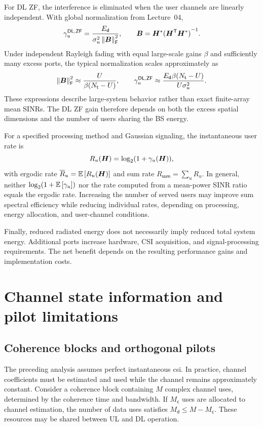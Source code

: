 For DL ZF, the interference is eliminated when the user channels are linearly independent. With global normalization from Lecture~04,
\begin{equation*}
	\gamma_u^{\mathsf{DL},\mathsf{ZF}}
	=\frac{E_{\mathsf{d}}}{\sigma_u^2\left\|\bm{B}\right\|_{\mathsf{F}}^2},
	\qquad
	\bm{B}=\bm{H}^*{({\bm{H}}^{\mathsf{T}}\bm{H}^*)}^{-1}.
\end{equation*}
Under independent Rayleigh fading with equal large-scale gains $\beta$ and sufficiently many excess ports, the typical normalization scales approximately as
\begin{equation*}
	\left\|\bm{B}\right\|_{\mathsf{F}}^2
	\approx\frac{U}{\beta(N_{\mathsf{t}}-U)},
	\qquad
	\gamma_u^{\mathsf{DL},\mathsf{ZF}}
	\approx\frac{E_{\mathsf{d}}\beta(N_{\mathsf{t}}-U)}{U\sigma_u^2}.
\end{equation*}
These expressions describe large-system behavior rather than exact finite-array mean SINRs. The DL ZF gain therefore depends on both the excess spatial dimensions and the number of users sharing the BS energy.

For a specified processing method and Gaussian signaling, the instantaneous user rate is
\begin{equation*}
	R_u(\bm{H})=\log_2(1+\gamma_u(\bm{H})),
\end{equation*}
with ergodic rate $\overline R_u=\mathbb{E}\left[R_u(\bm{H})\right]$ and sum rate $R_{\mathsf{sum}}=\sum_u R_u$. In general, neither $\log_2(1+\mathbb{E}\left[\gamma_u\right])$ nor the rate computed from a mean-power SINR ratio equals the ergodic rate. Increasing the number of served users may improve sum spectral efficiency while reducing individual rates, depending on processing, energy allocation, and user-channel conditions.

Finally, reduced radiated energy does not necessarily imply reduced total system energy. Additional ports increase hardware, CSI acquisition, and signal-processing requirements. The net benefit depends on the resulting performance gains and implementation costs.


\section{Channel state information and pilot limitations}
\label{sec:csi-05}

\subsection{Coherence blocks and orthogonal pilots}
The preceding analysis assumes perfect instantaneous \ac{csi}. In practice, channel coefficients must be estimated and used while the channel remains approximately constant. Consider a coherence block containing $M$ complex channel uses, determined by the coherence time and bandwidth. If $M_{\mathsf c}$ uses are allocated to channel estimation, the number of data uses satisfies $M_{\mathsf d}\leq M-M_{\mathsf c}$. These resources may be shared between UL and DL operation.

